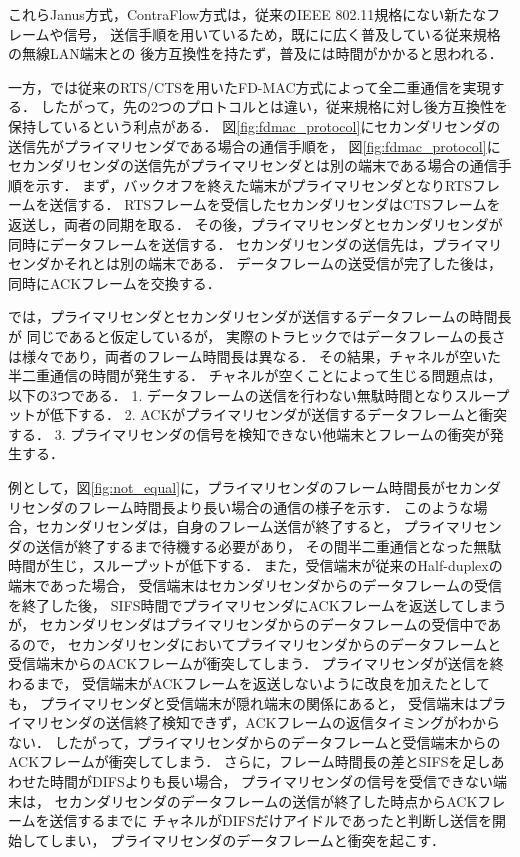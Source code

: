 \documentclass[master]{kuisthesis}		%
\begin{document}
			\par
			これらJanus方式，ContraFlow方式は，従来のIEEE 802.11規格にない新たなフレームや信号，
			送信手順を用いているため，既にに広く普及している従来規格の無線LAN端末との
			後方互換性を持たず，普及には時間がかかると思われる．

			\par
			一方，\cite{fdmac}では従来のRTS/CTSを用いたFD-MAC方式によって全二重通信を実現する．
			したがって，先の2つのプロトコルとは違い，従来規格に対し後方互換性を保持しているという利点がある．
			図\ref{fig:fdmac_protocol}にセカンダリセンダの送信先がプライマリセンダである場合の通信手順を，
			図\ref{fig:fdmac_protocol}にセカンダリセンダの送信先がプライマリセンダとは別の端末である場合の通信手順を示す．
			まず，バックオフを終えた端末がプライマリセンダとなりRTSフレームを送信する．
			RTSフレームを受信したセカンダリセンダはCTSフレームを返送し，両者の同期を取る．
			その後，プライマリセンダとセカンダリセンダが同時にデータフレームを送信する．
			セカンダリセンダの送信先は，プライマリセンダかそれとは別の端末である．
			データフレームの送受信が完了した後は，同時にACKフレームを交換する．

			\par
			\cite{fdmac}では，プライマリセンダとセカンダリセンダが送信するデータフレームの時間長が
			同じであると仮定しているが，
			実際のトラヒックではデータフレームの長さは様々であり，両者のフレーム時間長は異なる．
			その結果，チャネルが空いた半二重通信の時間が発生する．
			チャネルが空くことによって生じる問題点は，以下の3つである．
			1. データフレームの送信を行わない無駄時間となりスループットが低下する．
			2. ACKがプライマリセンダが送信するデータフレームと衝突する．
			3. プライマリセンダの信号を検知できない他端末とフレームの衝突が発生する．

			\par
			例として，図\ref{fig:not_equal}に，プライマリセンダのフレーム時間長がセカンダリセンダのフレーム時間長より長い場合の通信の様子を示す．
			このような場合，セカンダリセンダは，自身のフレーム送信が終了すると，
			プライマリセンダの送信が終了するまで待機する必要があり，
			その間半二重通信となった無駄時間が生じ，スループットが低下する．
			また，受信端末が従来のHalf-duplexの端末であった場合，
			受信端末はセカンダリセンダからのデータフレームの受信を終了した後，
			SIFS時間でプライマリセンダにACKフレームを返送してしまうが，
			セカンダリセンダはプライマリセンダからのデータフレームの受信中であるので，
			セカンダリセンダにおいてプライマリセンダからのデータフレームと受信端末からのACKフレームが衝突してしまう．
			プライマリセンダが送信を終わるまで，
			受信端末がACKフレームを返送しないように改良を加えたとしても，
			プライマリセンダと受信端末が隠れ端末の関係にあると，
			受信端末はプライマリセンダの送信終了検知できず，ACKフレームの返信タイミングがわからない．
			したがって，プライマリセンダからのデータフレームと受信端末からのACKフレームが衝突してしまう．
			さらに，フレーム時間長の差とSIFSを足しあわせた時間がDIFSよりも長い場合，
			プライマリセンダの信号を受信できない端末は，
			セカンダリセンダのデータフレームの送信が終了した時点からACKフレームを送信するまでに
			チャネルがDIFSだけアイドルであったと判断し送信を開始してしまい，
			プライマリセンダのデータフレームと衝突を起こす．
\end{document}
